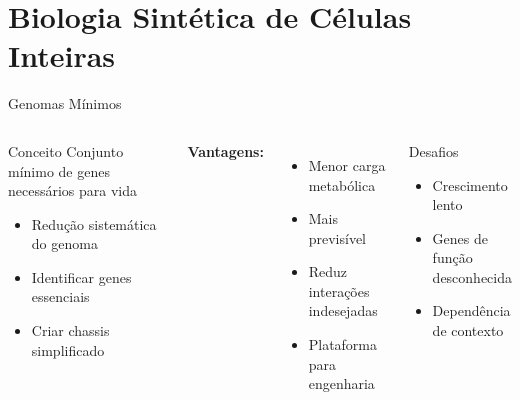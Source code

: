 \section{Biologia Sintética de Células Inteiras}

\begin{frame}{Genomas Mínimos}
\begin{columns}
\begin{block}{Conceito}
Conjunto mínimo de genes necessários para vida
\begin{itemize}
    \item Redução sistemática do genoma
    \item Identificar genes essenciais
    \item Criar chassis simplificado
\end{itemize}
\end{block}

\textbf{Vantagens:}
\begin{itemize}
    \item Menor carga metabólica
    \item Mais previsível
    \item Reduz interações indesejadas
    \item Plataforma para engenharia
\end{itemize}


\vspace{0.3cm}

\begin{alertblock}{Desafios}
\begin{itemize}
    \item Crescimento lento
    \item Genes de função desconhecida
    \item Dependência de contexto
\end{itemize}
\end{alertblock}
\end{columns}
\end{frame}

